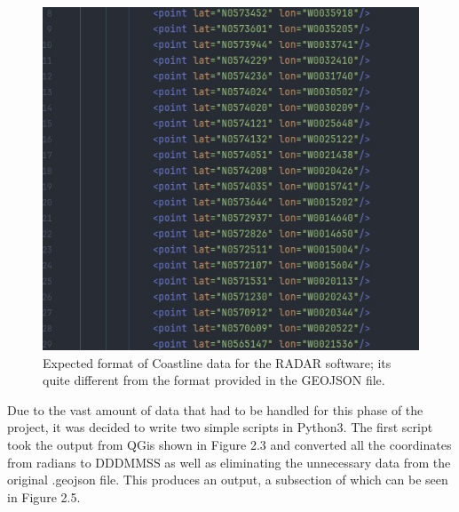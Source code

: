 \documentclass[stu, a4paper, 12pt, floatsintext]{apa7}
\numberwithin{figure}{section}
\numberwithin{table}{section}
\numberwithin{equation}{section}
\begin{document}
\begin{figure}[H]
    \caption{Expected format of Coastline data for the RADAR software; its quite different from the format provided in the GEOJSON file.}
    \label{fig:2.4}
    \centering
    \includegraphics[width=1.1\textwidth]{pictures/Figure 2.4 FYP.jpg}    
\end{figure}

Due to the vast amount of data that had to be handled for this phase of the project, it was decided to write two simple scripts in Python3. The first script took the output from QGis shown in Figure 2.3 and converted all the coordinates from radians to DDDMMSS as well as eliminating the unnecessary data from the original .geojson file. This produces an output, a subsection of which can be seen in Figure 2.5.
\end{document}
